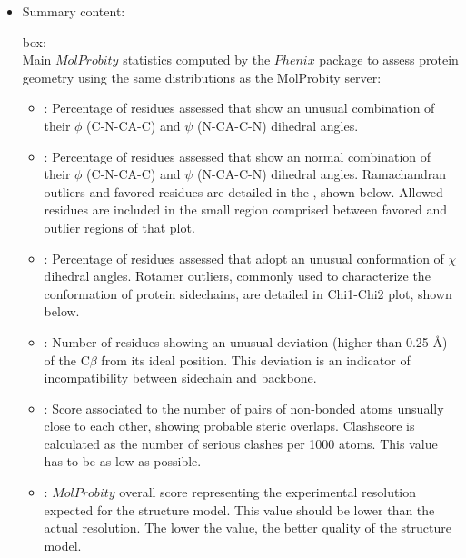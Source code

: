 \begin{itemize}
 \item Summary content:
 
   box:\\Main $MolProbity$ statistics computed by the $Phenix$ package to assess protein geometry using the same distributions as the MolProbity server:
      \begin{itemize}     
        \item {}: Percentage of residues assessed that show an unusual combination of their $\phi$ (C-N-CA-C) and $\psi$ (N-CA-C-N) dihedral angles.
        \item {}: Percentage of residues assessed that show an normal combination of their $\phi$ (C-N-CA-C) and $\psi$ (N-CA-C-N) dihedral angles. Ramachandran outliers and favored residues are detailed in the , shown below. Allowed residues are included in the small region comprised between favored and outlier regions of that plot.
        \item {}: Percentage of residues assessed that adopt an unusual conformation of $\chi$ dihedral angles. Rotamer outliers, commonly used to characterize the conformation of protein sidechains, are detailed in Chi1-Chi2 plot, shown below.
        \item {}: Number of residues showing an unusual deviation (higher than 0.25 \AA) of the C{$\beta$} from its ideal position. This deviation is an indicator of incompatibility between sidechain and backbone. 
        \item {}: Score associated to the number of pairs of non-bonded atoms unsually close to each other, showing probable steric overlaps. Clashscore is calculated as the number of serious clashes per 1000 atoms. This value has to be as low as possible.
        \item {}: $MolProbity$ overall score representing the experimental resolution expected for the structure model. This value should be lower than the actual resolution. The lower the value, the better quality of the structure model.
      \end{itemize}

\end{itemize}
